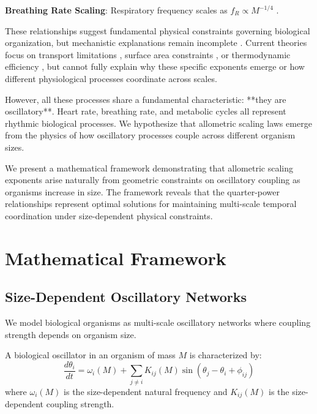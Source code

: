 \documentclass[twocolumn]{article}
\begin{document}
\textbf{Breathing Rate Scaling}: Respiratory frequency scales as $f_R \propto M^{-1/4}$ \citep{stahl1967scaling}.

These relationships suggest fundamental physical constraints governing biological organization, but mechanistic explanations remain incomplete \citep{savage2004quantitative}. Current theories focus on transport limitations \citep{west1997general}, surface area constraints \citep{schmidt1984scaling}, or thermodynamic efficiency \citep{brown2004toward}, but cannot fully explain why these specific exponents emerge or how different physiological processes coordinate across scales.

However, all these processes share a fundamental characteristic: **they are oscillatory**. Heart rate, breathing rate, and metabolic cycles all represent rhythmic biological processes. We hypothesize that allometric scaling laws emerge from the physics of how oscillatory processes couple across different organism sizes.

We present a mathematical framework demonstrating that allometric scaling exponents arise naturally from geometric constraints on oscillatory coupling as organisms increase in size. The framework reveals that the quarter-power relationships represent optimal solutions for maintaining multi-scale temporal coordination under size-dependent physical constraints.

\section{Mathematical Framework}

\subsection{Size-Dependent Oscillatory Networks}

We model biological organisms as multi-scale oscillatory networks where coupling strength depends on organism size.

\begin{definition}
A biological oscillator in an organism of mass $M$ is characterized by:
\begin{equation}
\frac{d\theta_i}{dt} = \omega_i(M) + \sum_{j \neq i} K_{ij}(M) \sin(\theta_j - \theta_i + \phi_{ij})
\label{eq:size_oscillator}
\end{equation}
where $\omega_i(M)$ is the size-dependent natural frequency and $K_{ij}(M)$ is the size-dependent coupling strength.
\end{definition}
\end{document}
